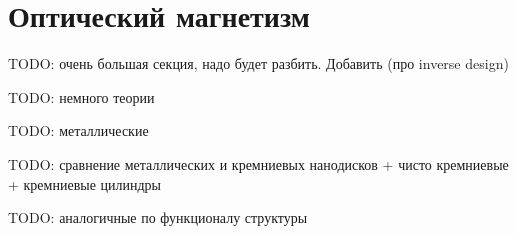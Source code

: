 \section{Оптический магнетизм}

TODO: очень большая секция, надо будет разбить. Добавить \cite{Piggott2015} (про inverse design)

TODO: немного теории \cite{Shalaev2007}

TODO: металлические \cite{Enkrich2005, Evlyukhin2012, Klein2006}

TODO: сравнение металлических и кремниевых нанодисков \cite{Miro2012} + чисто кремниевые \cite{Evlyukhin2012a, Staude2013} + кремниевые цилиндры \cite{Evlyukhin2014}

TODO: аналогичные по функционалу структуры \cite{Vilson2004, Gondarenko2009, Kippenberg2004, Pollinger2009, Soltani2007}